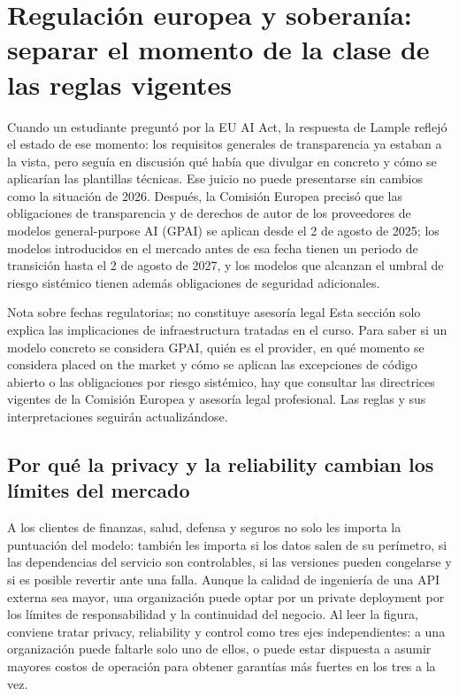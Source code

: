 \section{Regulación europea y soberanía: separar el momento de la clase de las reglas vigentes}

Cuando un estudiante preguntó por la EU AI Act, la respuesta de Lample reflejó el estado de ese momento: los requisitos generales de transparencia ya estaban a la vista, pero seguía en discusión qué había que divulgar en concreto y cómo se aplicarían las plantillas técnicas. Ese juicio no puede presentarse sin cambios como la situación de 2026. Después, la Comisión Europea precisó que las obligaciones de transparencia y de derechos de autor de los proveedores de modelos general-purpose AI (GPAI) se aplican desde el 2 de agosto de 2025; los modelos introducidos en el mercado antes de esa fecha tienen un periodo de transición hasta el 2 de agosto de 2027, y los modelos que alcanzan el umbral de riesgo sistémico tienen además obligaciones de seguridad adicionales.

\begin{warningbox}{Nota sobre fechas regulatorias; no constituye asesoría legal}
Esta sección solo explica las implicaciones de infraestructura tratadas en el curso. Para saber si un modelo concreto se considera GPAI, quién es el provider, en qué momento se considera placed on the market y cómo se aplican las excepciones de código abierto o las obligaciones por riesgo sistémico, hay que consultar las directrices vigentes de la Comisión Europea y asesoría legal profesional. Las reglas y sus interpretaciones seguirán actualizándose.
\end{warningbox}

\subsection{Por qué la privacy y la reliability cambian los límites del mercado}

A los clientes de finanzas, salud, defensa y seguros no solo les importa la puntuación del modelo: también les importa si los datos salen de su perímetro, si las dependencias del servicio son controlables, si las versiones pueden congelarse y si es posible revertir ante una falla. Aunque la calidad de ingeniería de una API externa sea mayor, una organización puede optar por un private deployment por los límites de responsabilidad y la continuidad del negocio. Al leer la figura, conviene tratar privacy, reliability y control como tres ejes independientes: a una organización puede faltarle solo uno de ellos, o puede estar dispuesta a asumir mayores costos de operación para obtener garantías más fuertes en los tres a la vez.

